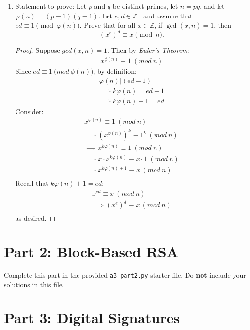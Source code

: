 \documentclass[11pt]{article}
\begin{document}
\begin{enumerate}
\newpage

\item[3.] Statement to prove:
Let $p$ and $q$ be distinct primes, let $n = pq$, and let $\varphi(n) = (p - 1)(q - 1)$.
Let $e, d \in \mathbb{Z}^+$ and assume that $ed \equiv 1 \pmod{\varphi(n)}$.
Prove that for all $x \in \mathbb{Z}$, if $\gcd(x, n) = 1$, then
\[
(x^e)^d \equiv x \pmod n.
\]

\begin{proof}
Suppose $gcd(x,n) =1$. Then by \textit{Euler's Theorem}:
\begin{align*}
x^{\phi(n)} \equiv 1 \ (mod \ n)
\end{align*}
Since $ed \equiv 1 \ \big(mod \ \phi(n)\big)$, by definition:
\begin{align*}
\varphi(n)|(ed-1) \\
\implies k\varphi(n) = ed - 1 \\
\implies k\varphi(n) +1 = ed
\end{align*}
Consider:
\begin{align*}
x^{\varphi(n)} \equiv 1 \ (mod \ n) \\
\implies(x^{\varphi(n)})^k \equiv 1^k \ (mod \ n) \\
\implies x^{k\varphi(n)} \equiv 1 \ (mod \ n) \\
\implies x \cdot x^{k\varphi(n)} \equiv x \cdot 1 \ (mod \ n) \\
\implies x^{k\varphi(n)+1} \equiv x\ (mod \ n) \\
\end{align*}
Recall that $k\varphi(n) +1 = ed$:
\begin{align*}
x^{ed} \equiv x\ (mod \ n) \\
\implies (x^{e})^d \equiv x\ (mod \ n) \\
\end{align*}
as desired.
\end{proof}
\end{enumerate}


\newpage

\section*{Part 2: Block-Based RSA}

Complete this part in the provided \texttt{a3\_part2.py} starter file.
Do \textbf{not} include your solutions in this file.

\section*{Part 3: Digital Signatures}
\end{document}
